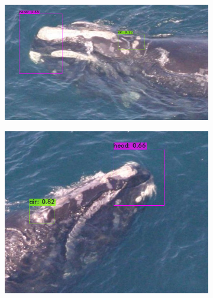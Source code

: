\documentclass[12pt,a4paper]{report}
\begin{document}
\begin{spacing}{1.5}
\begin{figure}[H] %
\begin{subfigure}{0.56\textwidth}
\includegraphics[width=\linewidth]{figures/sortie/yolov4/predictions1.jpg}
\end{subfigure}\hspace*{\fill}
\begin{subfigure}{0.5\textwidth}
\includegraphics[width=\linewidth]{figures/sortie/yolov4/predictions2.jpg}
\end{subfigure}
\medskip
\begin{subfigure}{0.55\textwidth}

\end{subfigure}
\end{figure}
\end{spacing}
\end{document}
